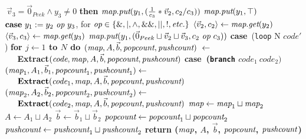 \begin{algorithm}
\begin{algorithmic}
 $~\vec v_3 = \vec 0_{Peek} \wedge y_3 \ne 0$ {\bf then}
\IND
\STATE $\mbox{\it map}.\mbox{\it put}(y_1, (\frac{1}{c_3}*\vec v_2, c_2/c_3))$
\UND
{}
\IND
\STATE $\mbox{\it map}.\mbox{\it put}(y_1, \top)$
\UND
\UND
\STATE \vspace{-6pt}
\STATE $\mbox{\bf case}~y_1 := y_2 ~\mbox{\it op}~ y_3$, for $\mbox{\it op} \in \{\&, |, \wedge, \&\&, ||, !, \mbox{\it etc.}\}$
\IND
\STATE $\langle{\vec v_2}, {c_2}\rangle \leftarrow \mbox{\it map}.\mbox{\it get}(y_2)$
\STATE $\langle{\vec v_3}, {c_3}\rangle \leftarrow \mbox{\it map}.\mbox{\it get}(y_3)$
\STATE $\mbox{\it map}.\mbox{\it put}(y_1, (\vec 0_{Peek} \sqcup \vec v_2 \sqcup \vec v_3, c_2 ~\mbox{\it op}~ c_3))$
\UND
\STATE \vspace{-6pt}
\STATE \mbox{\bf case}~({\tt loop} N $code'$)
\IND
\STATE \bf{for} $j \leftarrow 1$ to $N$ {\bf do}
\IND
\STATE $(\mbox{\it map}, A, {\vec b}, \mbox{\it popcount}, \mbox{\it pushcount})~\leftarrow~$ \\
\verb+   +\bf{Extract}$(\mbox{\it code}, \mbox{\it map}, A, {\vec b}, \mbox{\it popcount}, \mbox{\it pushcount})$
\UND
\UND
\STATE \vspace{-6pt}
\STATE \mbox{\bf case}~({\tt branch} $code_1~code_2)$
\IND
\STATE $(\mbox{\it map}_1, A_1, {\vec b_1}, \mbox{\it popcount}_1, \mbox{\it pushcount}_1) \leftarrow$ \\
\verb+   +${\mbox{\bf Extract}}(\mbox{\it code}_1, \mbox{\it map}, A, {\vec b}, \mbox{\it popcount}, \mbox{\it pushcount})$
\STATE $(\mbox{\it map}_2, A_2, {\vec b_2}, \mbox{\it popcount}_2, \mbox{\it pushcount}_2) \leftarrow$ \\ 
\verb+   +${\mbox{\bf Extract}}(\mbox{\it code}_2, \mbox{\it map}, A, {\vec b}, \mbox{\it popcount}, \mbox{\it pushcount})$
\STATE $\mbox{\it map} \leftarrow \mbox{\it map}_1 \sqcup \mbox{\it map}_2$
\STATE $A \leftarrow A_1 \sqcup A_2$
\STATE ${\vec b} \leftarrow {\vec b_1} \sqcup {\vec b_2}$
\STATE $\mbox{\it popcount} \leftarrow \mbox{\it popcount}_1 \sqcup \mbox{\it popcount}_2$
\STATE $\mbox{\it pushcount} \leftarrow \mbox{\it pushcount}_1 \sqcup \mbox{\it pushcount}_2$
\UND
\UND %
\ENDFOR
\STATE return ($\mbox{\it map}$, $A$, ${\vec b}$, $\mbox{\it popcount}$, $\mbox{\it pushcount}$)
\end{algorithmic}
\end{algorithm}
